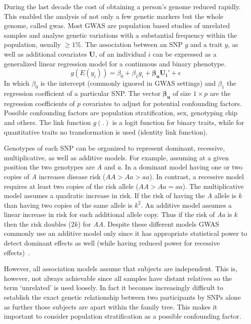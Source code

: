 \documentclass[../header.tex]{subfiles}
\begin{document}
During the last decade the cost of obtaining a person's genome reduced rapidly.
This enabled the analysis of not only a few genetic markers but the whole genome, called \acrfull{gwas}.
Most GWAS are population based studies of unrelated samples and analyse genetic variations with a substantial frequency within the population, usually $\ge 1\%$.
The association between an SNP $g$ and a trait $y$, as well as additional covariates $\pmb{U}$, of an individual $i$ can be expressed as a generalized linear regression model for a continuous and binary phenotype.
\begin{equation}
  g(E(y_i)) = \beta_0 + \beta_1g_i + \pmb{\beta_u}\pmb{U_i'} + \epsilon
\end{equation}
In which $\beta_0$ is the intercept (commonly ignored in GWAS settings) and $\beta_1$ the regression coefficient of a particular SNP\@.
The vector $\pmb{\beta_u}$ of size $1\times p$ are the regression coefficients of $p$ covariates to adjust for potential confounding factors.
Possible confounding factors are population stratification, sex, genotyping chip and others.
The link function $g(.)$ is a logit function for binary traits, while for quantitative traits no transformation is used (identity link function). 

Genotypes of each SNP can be organized to represent dominant, recessive, multiplicative, as well as additive models.
For example, assuming at a given position the two genotypes are \textit{A} and \textit{a}.
In a dominant model having one or two copies of \textit{A} increases disease risk ($AA > Aa > aa$).
In contrast, a recessive model requires at least two copies of the risk allele ($AA > Aa = aa$).
The multiplicative model assumes a quadratic increase in risk.
If the risk of having the \textit{A} allele is $k$ than having two copies of the same allele is $k^2$.
An additive model assumes a linear increase in risk for each additional allele copy.
Thus if the risk of \textit{Aa} is $k$ then the risk doubles ($2k$) for \textit{AA}. 
Despite these different models GWAS commonly use an additive model only since it has appropriate statistical power to detect dominant effects as well (while having reduced power for recessive effects)~\cite{Bush2012}.

However, all association models assume that subjects are independent.
This is, however, not always achievable since all samples have distant relatives so the term `unrelated' is used loosely.
In fact it becomes increasingly difficult to establish the exact genetic relationship between two participants by SNPs alone as further those subjects are apart within the family tree.
This makes it important to consider population stratification as a possible confounding factor.
\end{document}
